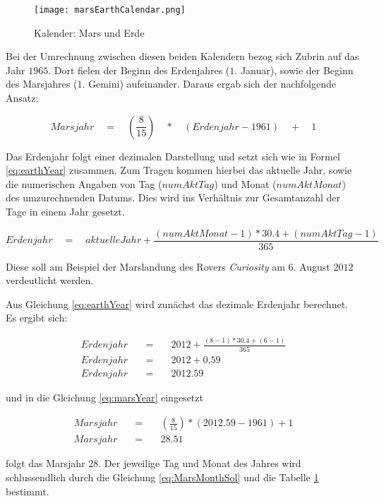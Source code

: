 \begin{figure}[H]
	\centering
	\texttt{[image: marsEarthCalendar.png]}
	\label{fig:marsEarthCalendar}
	\caption{Kalender: Mars und Erde}
\end{figure}

Bei der Umrechnung zwischen diesen beiden Kalendern bezog sich Zubrin auf das
Jahr $1965$. Dort fielen der Beginn des Erdenjahres ($1.$ Januar), sowie der
Beginn des Marsjahres ($1.$ Gemini) aufeinander. Daraus ergab sich der
nachfolgende Ansatz:

\begin{equation}
	Marsjahr \quad = \quad (\frac{8}{15}) \quad * \quad (Erdenjahr - 1961) \quad +
	\quad 1
	\label{eq:marsYear}
\end{equation}

Das Erdenjahr folgt einer dezimalen Darstellung und setzt sich wie in Formel
\ref{eq:earthYear} zusammen. Zum Tragen kommen hierbei das aktuelle Jahr, sowie
die numerischen Angaben von Tag ($numAktTag$) und Monat ($numAktMonat$) des
umzurechnenden Datums. Dies wird ins Verh{\"a}ltnis zur Gesamtanzahl der Tage in
einem Jahr gesetzt.

\begin{equation}
	Erdenjahr \quad = \quad aktuelleJahr + \frac{ (numAktMonat - 1) * 30.4 +
	(numAktTag - 1) }{365}
	\label{eq:earthYear}
\end{equation}

Diese soll am Beispiel der Marslandung des Rovers \textit{Curiosity} am
$6.$ August $2012$ verdeutlicht werden.

Aus Gleichung \ref{eq:earthYear} wird zun{\"a}chst das dezimale Erdenjahr
berechnet.
Es ergibt sich:

\begin{eqnarray}
	Erdenjahr \quad & = & \quad 2012 + \frac{ (8-1) * 30.4 + (6-1) }{365} \\
	Erdenjahr \quad & = & \quad 2012 + 0.59 \\
	Erdenjahr \quad & = & \quad 2012.59
\end{eqnarray}

und in die Gleichung \ref{eq:marsYear} eingesetzt

\begin{eqnarray}
	Marsjahr \quad & = & \quad (\frac{8}{15}) * (2012.59 - 1961) + 1 \\
	Marsjahr \quad & = & \quad 28.51
\end{eqnarray}

folgt das Marsjahr $28$. Der jeweilige Tag und Monat des Jahres wird
schlussendlich durch die Gleichung \ref{eq:MarsMonthSol} und die Tabelle
\ref{fig:marsEarthCalendar} bestimmt.

